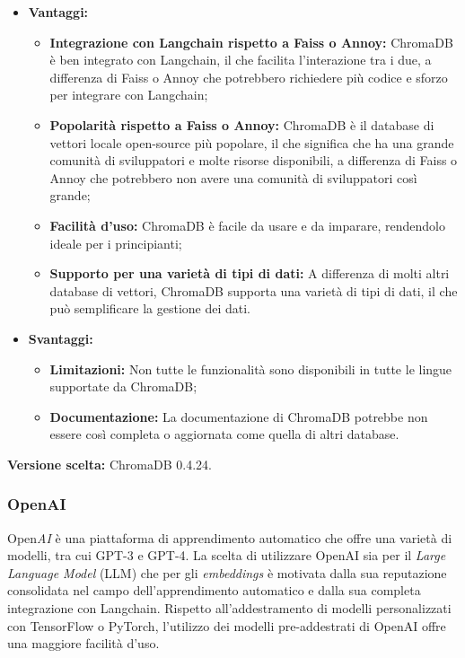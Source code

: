 \documentclass[10pt, a4paper]{article}
\begin{document}
\begin{itemize}
\item \textbf{Vantaggi:}
\begin{itemize}
\item \textbf{Integrazione con Langchain rispetto a Faiss o Annoy:} ChromaDB è ben integrato con Langchain, il che facilita l'interazione tra i due, a differenza di Faiss o Annoy che potrebbero richiedere più codice e sforzo per integrare con Langchain;
\item \textbf{Popolarità rispetto a Faiss o Annoy:} ChromaDB è il database di vettori locale open-source più popolare, il che significa che ha una grande comunità di sviluppatori e molte risorse disponibili, a differenza di Faiss o Annoy che potrebbero non avere una comunità di sviluppatori così grande;
\item \textbf{Facilità d'uso:} ChromaDB è facile da usare e da imparare, rendendolo ideale per i principianti;
\item \textbf{Supporto per una varietà di tipi di dati:} A differenza di molti altri database di vettori, ChromaDB supporta una varietà di tipi di dati, il che può semplificare la gestione dei dati.
\end{itemize}
\item \textbf{Svantaggi:}
\begin{itemize}
\item \textbf{Limitazioni:} Non tutte le funzionalità sono disponibili in tutte le lingue supportate da ChromaDB;
\item \textbf{Documentazione:} La documentazione di ChromaDB potrebbe non essere così completa o aggiornata come quella di altri database.
\end{itemize}
\end{itemize}
\textbf{Versione scelta:} ChromaDB 0.4.24.

\subsubsection{OpenAI}
Open\textit{AI\pg} è una piattaforma di apprendimento automatico che offre una varietà di modelli, tra cui GPT-3 e GPT-4. La scelta di utilizzare OpenAI sia per il \textit{Large Language Model\pg} (LLM) che per gli \textit{embeddings\pg} è motivata dalla sua reputazione consolidata nel campo dell'apprendimento automatico e dalla sua completa integrazione con Langchain. Rispetto all’addestramento di modelli personalizzati con TensorFlow o PyTorch, l’utilizzo dei modelli pre-addestrati di OpenAI offre una maggiore facilità d’uso.
\end{document}
